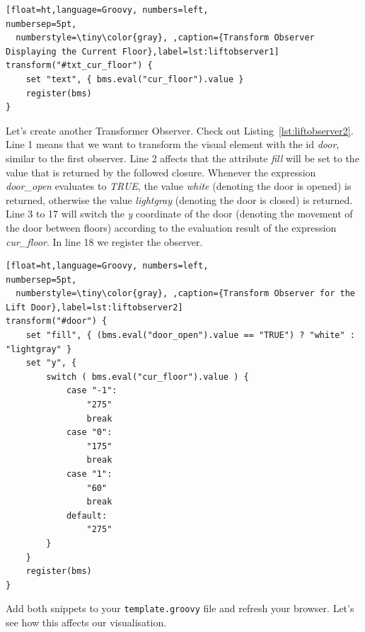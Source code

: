 \begin{lstlisting}[float=ht,language=Groovy, numbers=left,                   numbersep=5pt,            
  numberstyle=\tiny\color{gray}, ,caption={Transform Observer Displaying the Current Floor},label=lst:liftobserver1]
transform("#txt_cur_floor") {
    set "text", { bms.eval("cur_floor").value }
    register(bms)
}
\end{lstlisting}

Let's create another Transformer Observer.
Check out Listing~\ref{lst:liftobserver2}.
Line 1 means that we want to transform the visual element with the id \textit{door}, similar to the first observer.
Line 2 affects that the attribute \textit{fill} will be set to the value that is returned by the followed closure.
Whenever the expression \textit{door\_open} evaluates to \textit{TRUE}, the value \textit{white} (denoting the door is opened) is returned, otherwise the value \textit{lightgray} (denoting the door is closed) is returned.
Line 3 to 17 will switch the \textit{y} coordinate of the door (denoting the movement of the door between floors) according to the evaluation result of the expression \textit{cur\_floor}.
In line 18 we register the observer.

\begin{lstlisting}[float=ht,language=Groovy, numbers=left,                   numbersep=5pt,            
  numberstyle=\tiny\color{gray}, ,caption={Transform Observer for the Lift Door},label=lst:liftobserver2]
transform("#door") {
    set "fill", { (bms.eval("door_open").value == "TRUE") ? "white" : "lightgray" }
    set "y", {
        switch ( bms.eval("cur_floor").value ) {
            case "-1":
                "275"
                break
            case "0":
                "175"
                break
            case "1":
                "60"
                break
            default:
                "275"
        }
    }
    register(bms)
}
\end{lstlisting}

Add both snippets to your \texttt{template.groovy} file and refresh your browser.
Let's see how this affects our visualisation.


